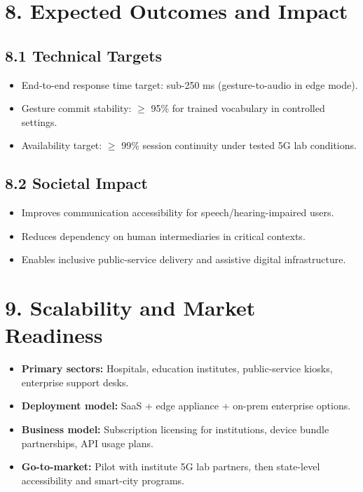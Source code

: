 \documentclass[11pt,a4paper]{article}
\begin{document}
\section*{8. Expected Outcomes and Impact}
\subsection*{8.1 Technical Targets}
\begin{itemize}
    \item End-to-end response time target: sub-250 ms (gesture-to-audio in edge mode).
    \item Gesture commit stability: $\geq$ 95\% for trained vocabulary in controlled settings.
    \item Availability target: $\geq$ 99\% session continuity under tested 5G lab conditions.
\end{itemize}

\subsection*{8.2 Societal Impact}
\begin{itemize}
    \item Improves communication accessibility for speech/hearing-impaired users.
    \item Reduces dependency on human intermediaries in critical contexts.
    \item Enables inclusive public-service delivery and assistive digital infrastructure.
\end{itemize}

\section*{9. Scalability and Market Readiness}
\begin{itemize}
    \item \textbf{Primary sectors:} Hospitals, education institutes, public-service kiosks, enterprise support desks.
    \item \textbf{Deployment model:} SaaS + edge appliance + on-prem enterprise options.
    \item \textbf{Business model:} Subscription licensing for institutions, device bundle partnerships, API usage plans.
    \item \textbf{Go-to-market:} Pilot with institute 5G lab partners, then state-level accessibility and smart-city programs.
\end{itemize}
\end{document}
